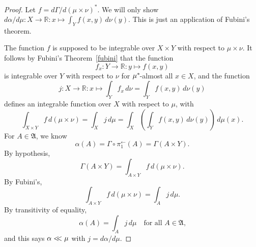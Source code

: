\documentclass[
twoside=true,
paper=letter,
fontsize=11pt,
pagesize=auto,
leqno,
openany,
headsepline,
overfullrule,
]{scrbook}
\theoremstyle{plain}
\theoremstyle{plain}
\theoremstyle{definition}
\theoremstyle{bfnoteitalic}
\theoremstyle{bfnoteroman}
\newcommand{\sigalg}[1]{\mathfrak{#1}}
\newcommand{\preimage}[1]{#1^{\leftarrow}}
\newcommand{\R}{\mathbb{R}}
\newcommand{\sigmaalgebra}{\sigalg{A}}
\newcommand{\kernast}{\ast\kern-1pt}
\newcommand{\funcj}{j}
\newcommand{\function}{f}
\newcommand{\measurespace}{X}
\newcommand{\measurespaceii}{Y}
\newcommand{\mspaceelt}{x}
\newcommand{\mspaceeltii}{y}
\newcommand{\abscont}{\mathrel{< \kern-3.5pt <}}
\newcommand{\measure}{\mu}
\newcommand{\measureii}{\nu}
\newcommand{\seti}{A}
\newcommand{\projectionone}{\pi_1}
\newcommand{\pspace}{\measurespace}%
\newcommand{\sspace}{\measurespaceii}%
\newcommand{\measonprod}{\Gamma}%
\newcommand{\marginalone}{\alpha}%
\begin{document}
\begin{proof}
Let
$\function = d\measonprod / d(\measure\times\measureii)^*$.
We will only show
$d \marginalone / d \measure
: \measurespace\to\R:
\mspaceelt\mapsto
\int_{\measurespaceii}\function(\mspaceelt,\mspaceeltii)\,d\measureii(\mspaceeltii)$.
This is just an application of Fubini's theorem.

The function $\function$ is supposed to be integrable over $\pspace\times\sspace$ with respect to 
$\measure\times\measureii$. It follows by
Fubini's Theorem~\ref{fubini} that
the function
\[
\function_\mspaceelt : 
\measurespaceii \to\R
: \mspaceeltii \mapsto \function(\mspaceelt,\mspaceeltii)
\]
is integrable over $\measurespaceii$ with respect to $\measureii$
 for
$\measure^\kernast$-almost all 
$\mspaceelt\in\measurespace$, 
and the function
\[
\funcj :\measurespace\to\R :\mspaceelt\mapsto
\int_\measurespaceii\function_\mspaceelt\,d\measureii
=
\int_{\measurespaceii}\function(\mspaceelt,\mspaceeltii) \, d\measureii(\mspaceeltii)
\]
defines an integrable function over $\measurespace$ with respect to 
$\measure$, with
\[
\int_{\measurespace\times\measurespaceii} 
\function \, d (\measure\times\measureii)
=
\int_\measurespace \funcj \,d \measure
=
\int_\measurespace
\left(
\int_\measurespaceii
\function(\mspaceelt,\mspaceeltii) 
\, d\measureii(\mspaceeltii)
\right) \, d\measure(\mspaceelt).
\]
For $\seti\in\sigmaalgebra$, 
we know 
\[
\marginalone(\seti) 
= \measonprod\circ\preimage{\projectionone}(\seti)
= \measonprod(\seti\times\measurespaceii).
\]
By hypothesis, 
\[
\measonprod(\seti\times\measurespaceii)
=
\int_{\seti\times\measurespaceii} \function \, d(\measure\times\measureii).
\]
By Fubini's,
\[
\int_{\seti\times\measurespaceii} \function 
\, d(\measure\times\measureii)
= \int_{\seti} \funcj \,d\measure.
\]
By transitivity of equality, 
\[
\marginalone(\seti)
=
\int_{\seti} \funcj \,d\measure
\quad
\text{for all $\seti\in\sigmaalgebra$,}
\]
and this says $\marginalone\abscont \measure$ with
$\funcj = d\marginalone/d\measure$.
\end{proof}
\end{document}
